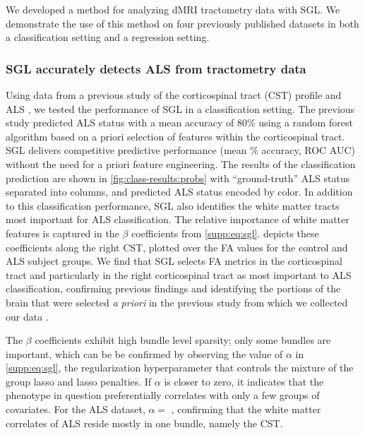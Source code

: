We developed a method for analyzing dMRI tractometry data with SGL. We
demonstrate the use of this method on four previously published datasets in
both a classification setting and a regression setting.

\subsubsection*{SGL accurately detects ALS from tractometry data}

Using data from a previous study of the corticospinal tract (CST) profile and
ALS \cite{sarica2017corticospinal}, we tested the performance of SGL in a
classification setting. The previous study predicted ALS status with a mean
accuracy of 80\% using a random forest algorithm based on a priori selection
of features within the corticospinal tract. SGL delivers competitive
predictive performance (mean {\alsAccuracy}\% accuracy, {\alsRocAuc} ROC AUC)
without the need for a priori feature engineering. The results of the
classification prediction are shown in \cref{fig:class-results:probs} with
``ground-truth'' ALS status separated into columns, and predicted ALS status
encoded by color. In addition to this classification performance, SGL also
identifies the white matter tracts most important for ALS classification. The
relative importance of white matter features is captured in the $\beta$
coefficients from \cref{supp:eq:sgl}. 
depicts these coefficients along the right CST, plotted over the FA values
for the control and ALS subject groups. We find that SGL selects FA metrics
in the corticospinal tract and particularly in the right corticospinal tract
as most important to ALS classification, confirming previous findings
\cite{van2011upper, toosy2003diffusion, sarica2014tractography,
sage2007quantitative, sage2009quantitative, karlsborg2004corticospinal,
ellis1999diffusion, cosottini2005diffusion, ciccarelli2009investigation,
abe2010voxel} and identifying the portions of the brain that were selected
\emph{a priori} in the previous study from which we collected our data
\cite{sarica2017corticospinal}.

The $\beta$ coefficients exhibit high bundle level sparsity; only some
bundles are important, which can be be confirmed by observing the value of
$\alpha$ in \cref{supp:eq:sgl}, the regularization hyperparameter that
controls the mixture of the group lasso and lasso penalties. If $\alpha$ is
closer to zero, it indicates that the phenotype in question preferentially
correlates with only a few groups of covariates. For the ALS dataset, $\alpha
= $ \alsLRatio, confirming that the white matter correlates of ALS reside
mostly in one bundle, namely the CST.

